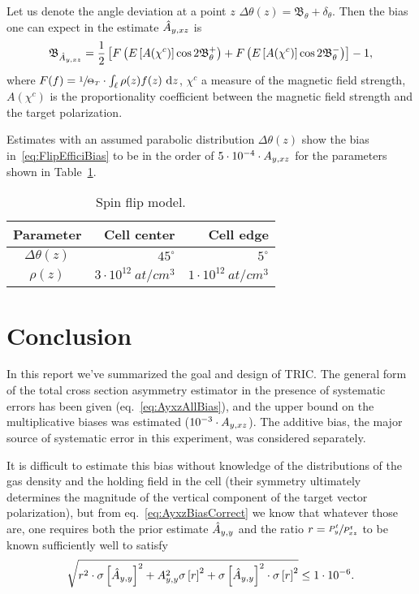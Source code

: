 \documentclass{article}
\newcommand{\bias}[1]{\mathfrak{B}_{#1}}
\newcommand{\rand}[1]{\delta_{#1}}
\begin{document}
Let us denote the angle deviation at a point $z$ $\Delta\theta(z) = \bias{\theta} + \rand{\theta}$. Then the bias one can expect in the estimate $\Ayxz*$ is~\cite{Diploma}
\begin{equation}\label{eq:FlipEfficiBias}
	\bias{\Ayxz*} = \frac{1}{2}\bkt*{F\bkt{\Xpct{A(\chi^c)}\cos2\bias{\theta}^+} + F\bkt{\Xpct{A(\chi^c)}\cos2\bias{\theta}^-}} - 1,
\end{equation}
where $F(f) = \sfrac{1}{\Thick[T]}\cdot\int_{\Lcell}\rho(z) f(z)~ \td z$, $\chi^c$ a measure of the magnetic field strength, $A(\chi^c)$ is the proportionality coefficient between the magnetic field strength and the target polarization.

Estimates with an assumed parabolic distribution $\Delta\theta(z)$ show the bias in~\eqref{eq:FlipEfficiBias} to be in the order of $5\cdot 10^{-4}\cdot\Ayxz$ for the parameters shown in Table~\ref{tbl:SpinFlip}.~\cite{Diploma} 

\begin{table}
	\centering
	\caption{Spin flip model.\label{tbl:SpinFlip}}
	\begin{tabular}{crr}
		\hline\hline
		    Parameter     &              Cell center &                Cell edge \\ \hline
		$\Delta\theta(z)$ &               $45^\circ$ &                $5^\circ$ \\
		    $\rho(z)$     & $3\cdot10^{12}~ at/cm^3$ & $1\cdot 10^{12}~at/cm^3$ \\ \hline
	\end{tabular}
\end{table}

\section*{Conclusion}
In this report we've summarized the goal and design of TRIC. The general form of the total cross section asymmetry estimator in the presence of systematic errors has been given (eq.~\eqref{eq:AyxzAllBias}), and the upper bound on the multiplicative biases was estimated ($10^{-3}\cdot\Ayxz$). The additive bias, the major source of systematic error in this experiment, was considered separately. 

It is difficult to estimate this bias without knowledge of the distributions of the gas density and the holding field in the cell (their symmetry ultimately determines the magnitude of the vertical component of the target vector polarization), but from eq.~\eqref{eq:AyxzBiasCorrect} we know that whatever those are, one requires both the prior estimate $\Ayy*$ and the ratio $r = \sfrac{P^t_y}{P^t_{xz}}$ to be known sufficiently well to satisfy
\begin{equation}
	\sqrt{r^2 \cdot\SE{\Ayy*}^2 + \Ayy^2\SE{r}^2 + \SE{\Ayy*}^2\cdot\SE{r}^2} \leq 1\cdot10^{-6}.
\end{equation}
\end{document}
